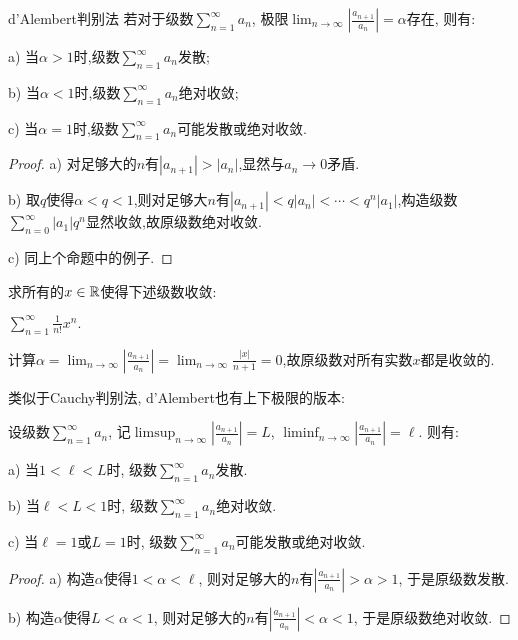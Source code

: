 \begin{proposition}{d’Alembert判别法}
	若对于级数$\sum_{n=1}^{\infty} a_n$, 极限$\lim_{n\to \infty}|\frac{a_{n+1}}{a_n} |=\alpha$存在, 则有:
	
	a) 当$\alpha >1$时,级数$\sum_{n=1}^{\infty} a_n$发散;
	
	b) 当$\alpha <1$时,级数$\sum_{n=1}^{\infty} a_n$绝对收敛;
	
	c) 当$\alpha =1$时,级数$\sum_{n=1}^{\infty} a_n$可能发散或绝对收敛.
\end{proposition}
\begin{proof}
	a) 对足够大的$n$有$|a_{n+1}|>|a_n|$,显然与$a_n\to 0$矛盾.
	
	b) 取$q$使得$\alpha < q <1$,则对足够大$n$有$|a_{n+1}|<q|a_n|<\cdots < q^n|a_1|$,构造级数$\sum_{n=0}^{\infty} |a_1|q^n$显然收敛,故原级数绝对收敛.
	
	c) 同上个命题中的例子.
\end{proof}

\begin{example}
	求所有的$x \in \mathbb{R}$使得下述级数收敛: 
	\begin{center}
		$\displaystyle \sum_{n=1}^{\infty} \frac{1}{n!}x^n.$
	\end{center}
\end{example}
\begin{solution}
	计算$\alpha = \lim_{n\to \infty}|\frac{a_{n+1}}{a_n} | = \lim_{n\to \infty} \frac{|x|}{n+1} = 0$,故原级数对所有实数$x$都是收敛的.
\end{solution}

类似于Cauchy判别法, d'Alembert也有上下极限的版本: 

\begin{corollary}{}
	设级数$\sum_{n=1}^{\infty} a_n$, 记$\limsup_{n\to \infty} |\frac{a_{n+1}}{a_n}|=L$, $\liminf_{n\to \infty} |\frac{a_{n+1}}{a_n}|=\ell$. 则有: 
	
	a) 当$1 < \ell < L$时, 级数$\sum_{n=1}^{\infty} a_n$发散. 
	
	b) 当$\ell < L < 1$时, 级数$\sum_{n=1}^{\infty} a_n$绝对收敛. 
	
	c) 当$\ell = 1$或$L =1$时, 级数$\sum_{n=1}^{\infty} a_n$可能发散或绝对收敛. 
\end{corollary}
\begin{proof}
	a) 构造$\alpha$使得$1<\alpha <\ell$, 则对足够大的$n$有$|\frac{a_{n+1}}{a_n}|>\alpha >1$, 于是原级数发散. 
	
	b) 构造$\alpha$使得$L<\alpha <1$, 则对足够大的$n$有$|\frac{a_{n+1}}{a_n}|<\alpha <1$, 于是原级数绝对收敛. 
\end{proof}

